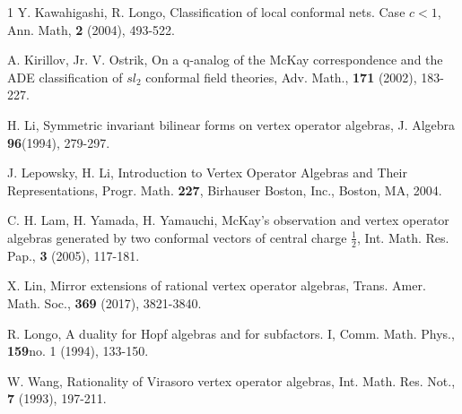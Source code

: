 \documentclass{article}
\begin{document}
\begin{thebibliography}{1}
	Y. Kawahigashi, R. Longo, Classification of local conformal nets. Case $c<1$, Ann. Math,
	\textbf{2} (2004), 493-522.
	
	 A. Kirillov, Jr. V. Ostrik,  On a q-analog of the McKay correspondence and the ADE classification of $sl_2$ conformal field theories,  Adv. Math., {\bf 171} (2002), 183-227.
	
	
	 H. Li, Symmetric invariant bilinear forms on vertex operator algebras, J. Algebra
	\textbf{96}(1994), 279-297.
	
	 J. Lepowsky, H. Li, Introduction to Vertex Operator Algebras and Their Representations, Progr. Math. {\bf 227}, Birhauser Boston, Inc., Boston, MA, 2004.
	
	 C. H. Lam, H. Yamada, H. Yamauchi, McKay's observation
	and vertex operator algebras generated by two conformal vectors of
	central charge $\frac{1}{2}$, Int. Math. Res. Pap., \textbf{3} (2005), 117-181.
	
	 X. Lin, Mirror extensions of rational vertex operator algebras,  Trans. Amer. Math. Soc., {\bf 369} (2017), 3821-3840.
	
	R. Longo, A duality for Hopf algebras and for subfactors. I, Comm. Math. Phys.,
	\textbf{159}no. 1 (1994), 133-150.
	
	W. Wang, Rationality of Virasoro vertex operator algebras, Int. Math. Res. Not., \textbf{7} (1993), 197-211.
	
	
\end{thebibliography}
\end{document}
